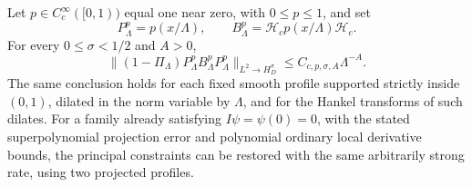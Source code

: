 \begin{proposition}
\label{prop:hankel-interior-approximation}
Let $p\in C_c^\infty([0,1))$ equal one near zero, with
$0\leq p\leq1$, and set
\[
 P^p_\Lambda=p(x/\Lambda),\qquad
 B^p_\Lambda=\mathcal H_cp(x/\Lambda)\mathcal H_c.
\]
For every $0\leq\sigma<1/2$ and $A>0$,
\[
 \|(1-\Pi_\Lambda)P^p_\Lambda B^p_\Lambda P^p_\Lambda
                         \|_{L^2\to H_D^\sigma}
                   \leq C_{c,p,\sigma,A}\Lambda^{-A}.
\]
The same conclusion holds for each fixed smooth profile supported
strictly inside $(0,1)$, dilated in the norm variable by $\Lambda$,
and for the Hankel transforms of such dilates. For a family already
satisfying $I\psi=\psi(0)=0$, with the stated superpolynomial
projection error and polynomial ordinary local derivative bounds,
the principal constraints can be restored with the same arbitrarily
strong rate, using two projected profiles.
\end{proposition}
